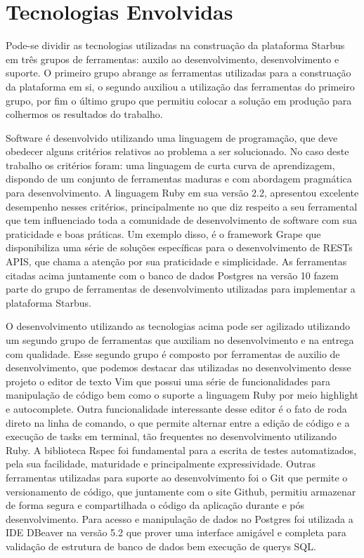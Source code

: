 \chapter{Tecnologias Envolvidas} \label{cha:tecnologias-envolvidas}

Pode-se dividir as tecnologias utilizadas na construação da plataforma Starbus em três grupos de ferramentas: 
auxilo ao desenvolvimento, desenvolvimento e suporte. O primeiro grupo abrange as ferramentas utilizadas para
a construação da plataforma em si, o segundo auxiliou a utilização das ferramentas do primeiro grupo, por fim 
o último grupo que permitiu colocar a solução em produção para colhermos os resultados do trabalho. 

Software é desenvolvido utilizando uma linguagem de programação, que deve obedecer alguns critérios relativos 
ao problema a ser solucionado. No caso deste trabalho os critérios foram: uma linguagem de curta curva de 
aprendizagem, dispondo de um conjunto de ferramentas maduras e com abordagem pragmática para desenvolvimento. 
A linguagem Ruby em sua versão 2.2, apresentou excelente desempenho nesses critérios, principalmente no que 
diz respeito a seu ferramental que tem influenciado toda a comunidade de desenvolvimento de software com sua 
praticidade e boas práticas. Um exemplo disso, é o framework Grape que disponibiliza uma série de soluções 
específicas para o desenvolvimento de RESTs APIS, que chama a atenção por sua praticidade e simplicidade. 
As ferramentas citadas acima juntamente com o banco de dados Postgres na versão 10 fazem parte do grupo de 
ferramentas de desenvolvimento utilizadas para implementar a plataforma Starbus.

O desenvolvimento utilizando as tecnologias acima pode ser agilizado utilizando um segundo grupo de ferramentas 
que auxiliam no desenvolvimento e na entrega com qualidade. Esse segundo grupo é composto por ferramentas de 
auxilio de desenvolvimento, que podemos destacar das utilizadas no desenvolvimento desse projeto o editor de 
texto Vim que possui uma série de funcionalidades para manipulação de código bem como o suporte a linguagem Ruby 
por meio highlight e autocomplete. Outra funcionalidade interessante desse editor é o fato de roda direto na 
linha de comando, o que permite alternar entre a edição de código e a execução de tasks em terminal, tão 
frequentes no desenvolvimento utilizando Ruby. A biblioteca Rspec foi fundamental para a escrita de testes 
automatizados, pela sua facilidade, maturidade e principalmente expressividade. Outras ferramentas utilizadas para 
suporte ao desenvolvimento foi o Git que permite o versionamento de código, que juntamente com o site Github, 
permitiu armazenar de forma segura e compartilhada o código da aplicação durante e pós desenvolvimento. Para 
acesso e manipulação de dados no Postgres foi utilizada a IDE DBeaver na versão 5.2 que prover uma interface 
amigável e completa para validação de estrutura de banco de dados bem execução de querys SQL. 

